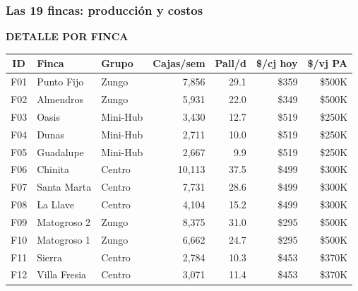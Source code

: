 \documentclass[aspectratio=169, 10pt]{beamer}
\newcommand{\tagline}[2]{{\scriptsize\color{#1}\textbf{\MakeUppercase{#2}}}}
\begin{document}
\begin{frame}
\frametitle{Las 19 fincas: producci\'on y costos}
\tagline{azul}{Detalle por Finca}
\vspace{-4pt}

\begin{center}
\tiny
\renewcommand{\arraystretch}{0.88}
\begin{tabular}{c l l r r r r}
    \toprule
    \textbf{ID} & \textbf{Finca} & \textbf{Grupo} & \textbf{Cajas/sem} & \textbf{Pall/d} & \textbf{\$/cj hoy} & \textbf{\$/vj PA} \\
    \midrule
    \rowcolor{amarilloclaro}
    F01 & Punto Fijo    & \textcolor{naranja}{Zungo}    & 7,856 & 29.1 & \$359 & \$500K \\
    \rowcolor{amarilloclaro}
    F02 & Almendros     & \textcolor{naranja}{Zungo}    & 5,931 & 22.0 & \$349 & \$500K \\
    \rowcolor{azulclaro}
    F03 & Oasis         & \textcolor{cian}{Mini-Hub}     & 3,430 & 12.7 & \$519 & \$250K \\
    \rowcolor{azulclaro}
    F04 & Dunas         & \textcolor{cian}{Mini-Hub}     & 2,711 & 10.0 & \$519 & \$250K \\
    \rowcolor{azulclaro}
    F05 & Guadalupe     & \textcolor{cian}{Mini-Hub}     & 2,667 &  9.9 & \$519 & \$250K \\
    \rowcolor{verdeclaro}
    F06 & Chinita       & \textcolor{verde}{Centro}      & 10,113 & 37.5 & \$499 & \$300K \\
    \rowcolor{verdeclaro}
    F07 & Santa Marta   & \textcolor{verde}{Centro}      & 7,731 & 28.6 & \$499 & \$300K \\
    \rowcolor{verdeclaro}
    F08 & La Llave      & \textcolor{verde}{Centro}      & 4,104 & 15.2 & \$499 & \$300K \\
    \rowcolor{amarilloclaro}
    F09 & Matogroso 2   & \textcolor{naranja}{Zungo}     & 8,375 & 31.0 & \$295 & \$500K \\
    \rowcolor{amarilloclaro}
    F10 & Matogroso 1   & \textcolor{naranja}{Zungo}     & 6,662 & 24.7 & \$295 & \$500K \\
    \rowcolor{verdeclaro}
    F11 & Sierra        & \textcolor{verde}{Centro}      & 2,784 & 10.3 & \$453 & \$370K \\
    \rowcolor{verdeclaro}
    F12 & Villa Fresia  & \textcolor{verde}{Centro}      & 3,071 & 11.4 & \$453 & \$370K \\

\end{tabular}
\end{center}
\end{frame}
\end{document}
